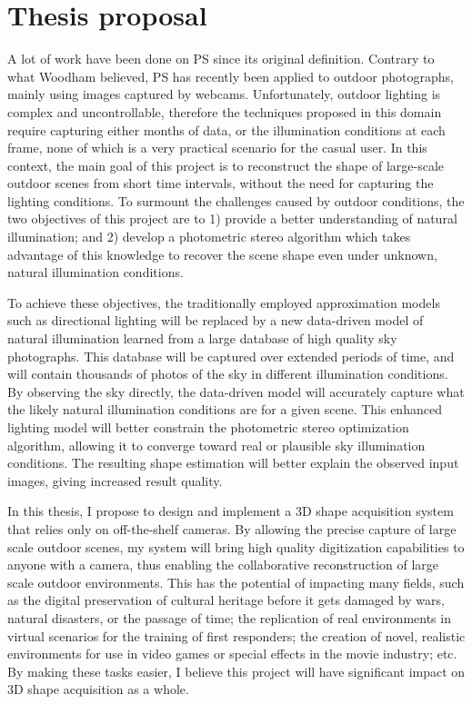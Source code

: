 \documentclass{report}
\begin{document}
\section{Thesis proposal}

A lot of work have been done on PS since its original definition. Contrary to what Woodham believed, PS has recently been applied to outdoor photographs, mainly using images captured by webcams. Unfortunately, outdoor lighting is complex and uncontrollable, therefore the techniques proposed in this domain require capturing either months of data, or the illumination conditions at each frame, none of which is a very practical scenario for the casual user. In this context, the main goal of this project is to reconstruct the shape of large-scale outdoor scenes from short time intervals, without the need for capturing the lighting conditions. To surmount the challenges caused by outdoor conditions, the two objectives of this project are to 1) provide a better understanding of natural illumination; and 2) develop a photometric stereo algorithm which takes advantage of this knowledge to recover the scene shape even under unknown, natural illumination conditions.

To achieve these objectives, the traditionally employed approximation models such as directional lighting will be replaced by a new data-driven model of natural illumination learned from a large database of high quality sky photographs. This database will be captured over extended periods of time, and will contain thousands of photos of the sky in different illumination conditions. By observing the sky directly, the data-driven model will accurately capture what the likely natural illumination conditions are for a given scene. This enhanced lighting model will better constrain the photometric stereo optimization algorithm, allowing it to converge toward real or plausible sky illumination conditions. The resulting shape estimation will better explain the observed input images, giving increased result quality.

In this thesis, I propose to design and implement a 3D shape acquisition system that relies only on off-the-shelf cameras. By allowing the precise capture of large scale outdoor scenes, my system will bring high quality digitization capabilities to anyone with a camera, thus enabling the collaborative reconstruction of large scale outdoor environments. This has the potential of impacting many fields, such as the digital preservation of cultural heritage before it gets damaged by wars, natural disasters, or the passage of time; the replication of real environments in virtual scenarios for the training of first responders; the creation of novel, realistic environments for use in video games or special effects in the movie industry; etc. By making these tasks easier, I believe this project will have significant impact on 3D shape acquisition as a whole.
\end{document}
